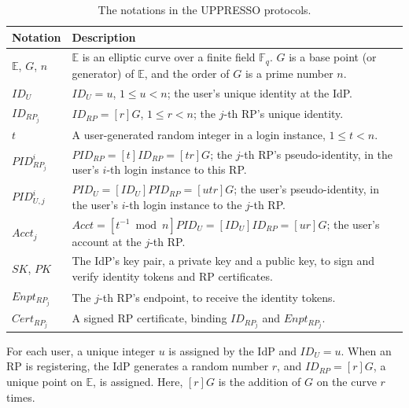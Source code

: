 \begin{table}[tb]
\footnotesize
    \caption{The notations in the UPPRESSO protocols.}
    \centering
    \begin{tabular}{|p{1.0cm}|p{6.60cm}|} \hline
    {\textbf{Notation}} & {\textbf{Description}} \\ \hline
    {$\mathbb{E}$, $G$, $n$} & {$\mathbb{E}$ is an elliptic curve over a finite field $\mathbb{F}_q$. $G$ is a base point (or generator) of $\mathbb{E}$, and the order of $G$ is a prime number $n$.} \\ \hline
    {$ID_U$} & {$ID_U = u$, $1 \leq u < n$; the user's unique identity at the IdP.} \\ \hline
   {$ID_{RP_j}$} & {$ID_{RP} = [r]G$, $1 \leq r < n$; the $j$-th RP's unique identity.} \\ \hline
    {$t$} & {A user-generated random integer in a login instance, $1 \leq t < n$.} \\ \hline
    {$PID_{RP_j}^i$} & {$PID_{RP} = [t]{ID_{RP}} = [tr]G$; the $j$-th RP's pseudo-identity, in the user's $i$-th login instance to this RP.} \\ \hline
    {$PID_{U,j}^i$} & {$PID_U = [{ID_U}]{PID_{RP}} = [utr]G$; the user's pseudo-identity, in the user's $i$-th login instance to the $j$-th RP.} \\ \hline
     {$Acct_j$} & {$Acct = [t^{-1}\bmod n]PID_{U} = [ID_U]ID_{RP} = [ur]G$; the user's account at the $j$-th RP.} \\ \hline
    {$SK$, $PK$} & {The IdP's key pair, a private key and a public key, to sign and verify identity tokens and RP certificates.} \\ \hline
    {$Enpt_{RP_j}$} & {The $j$-th RP's endpoint, to receive the identity tokens.} \\ \hline
    {$Cert_{RP_j}$} & {A signed RP certificate, binding $ID_{RP_j}$ and $Enpt_{RP_j}$.} \\ \hline
    \end{tabular}
    \label{tbl:notations-protocol}
\end{table}


For each user,
           a unique integer $u$ is assigned by the IdP and $ID_U = u$.
When an RP is registering,
            the IdP generates a random number $r$, and $ID_{RP} = [r]G$, a unique point on $\mathbb{E}$, is assigned.
Here,
 $[r]G$ is the addition of $G$ on the curve $r$ times.


